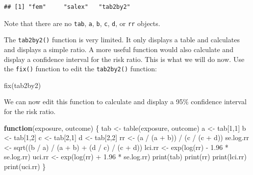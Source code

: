 \documentclass[
  12pt,
]{book}
\newenvironment{Shaded}{\begin{snugshade}}{\end{snugshade}}
\newcommand{\ControlFlowTok}[1]{\textcolor[rgb]{0.13,0.29,0.53}{\textbf{#1}}}
\newcommand{\DecValTok}[1]{\textcolor[rgb]{0.00,0.00,0.81}{#1}}
\newcommand{\FloatTok}[1]{\textcolor[rgb]{0.00,0.00,0.81}{#1}}
\newcommand{\FunctionTok}[1]{\textcolor[rgb]{0.00,0.00,0.00}{#1}}
\newcommand{\NormalTok}[1]{#1}
\newcommand{\OtherTok}[1]{\textcolor[rgb]{0.56,0.35,0.01}{#1}}
\newcommand{\SpecialCharTok}[1]{\textcolor[rgb]{0.00,0.00,0.00}{#1}}
\begin{document}
\begin{verbatim}
## [1] "fem"     "salex"   "tab2by2"
\end{verbatim}

Note that there are no \texttt{tab}, \texttt{a}, \texttt{b}, \texttt{c}, \texttt{d}, or \texttt{rr} objects.

The \texttt{tab2by2()} function is very limited. It only displays a table and calculates and displays a simple ratio. A more useful function would also calculate and display a confidence interval for the risk ratio. This is what we will do now. Use the \texttt{fix()} function to edit the \texttt{tab2by2()} function:

\begin{Shaded}
\begin{Highlighting}[]
\FunctionTok{fix}\NormalTok{(tab2by2)}
\end{Highlighting}
\end{Shaded}

We can now edit this function to calculate and display a 95\% confidence interval for the risk ratio.

\begin{Shaded}
\begin{Highlighting}[]
\ControlFlowTok{function}\NormalTok{(exposure, outcome) \{}
\NormalTok{  tab }\OtherTok{\textless{}{-}} \FunctionTok{table}\NormalTok{(exposure, outcome)}
\NormalTok{  a }\OtherTok{\textless{}{-}}\NormalTok{ tab[}\DecValTok{1}\NormalTok{,}\DecValTok{1}\NormalTok{]}
\NormalTok{  b }\OtherTok{\textless{}{-}}\NormalTok{ tab[}\DecValTok{1}\NormalTok{,}\DecValTok{2}\NormalTok{]}
\NormalTok{  c }\OtherTok{\textless{}{-}}\NormalTok{ tab[}\DecValTok{2}\NormalTok{,}\DecValTok{1}\NormalTok{]}
\NormalTok{  d }\OtherTok{\textless{}{-}}\NormalTok{ tab[}\DecValTok{2}\NormalTok{,}\DecValTok{2}\NormalTok{]}
\NormalTok{  rr }\OtherTok{\textless{}{-}}\NormalTok{ (a }\SpecialCharTok{/}\NormalTok{ (a }\SpecialCharTok{+}\NormalTok{ b)) }\SpecialCharTok{/}\NormalTok{ (c }\SpecialCharTok{/}\NormalTok{ (c }\SpecialCharTok{+}\NormalTok{ d))}
\NormalTok{  se.log.rr }\OtherTok{\textless{}{-}} \FunctionTok{sqrt}\NormalTok{((b }\SpecialCharTok{/}\NormalTok{ a) }\SpecialCharTok{/}\NormalTok{ (a }\SpecialCharTok{+}\NormalTok{ b) }\SpecialCharTok{+}\NormalTok{ (d }\SpecialCharTok{/}\NormalTok{ c) }\SpecialCharTok{/}\NormalTok{ (c }\SpecialCharTok{+}\NormalTok{ d)) }
\NormalTok{  lci.rr }\OtherTok{\textless{}{-}} \FunctionTok{exp}\NormalTok{(}\FunctionTok{log}\NormalTok{(rr) }\SpecialCharTok{{-}} \FloatTok{1.96} \SpecialCharTok{*}\NormalTok{ se.log.rr)}
\NormalTok{  uci.rr }\OtherTok{\textless{}{-}} \FunctionTok{exp}\NormalTok{(}\FunctionTok{log}\NormalTok{(rr) }\SpecialCharTok{+} \FloatTok{1.96} \SpecialCharTok{*}\NormalTok{ se.log.rr)}
  \FunctionTok{print}\NormalTok{(tab)}
  \FunctionTok{print}\NormalTok{(rr)}
  \FunctionTok{print}\NormalTok{(lci.rr)}
  \FunctionTok{print}\NormalTok{(uci.rr)}
\NormalTok{\}}
\end{Highlighting}
\end{Shaded}
\end{document}
